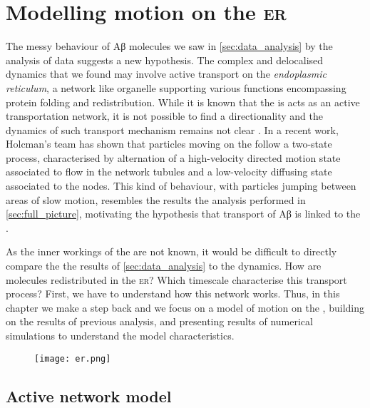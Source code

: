 
\chapter{Modelling motion on the \textsc{er}}\label{sec:modelling}

The messy behaviour of Aβ molecules we saw in \cref{sec:data_analysis} by the analysis of  data suggests a new hypothesis. The complex and delocalised dynamics that we found may involve active transport on the \emph{endoplasmic reticulum}, a network like organelle supporting various functions encompassing protein folding and redistribution. While it is known that the  is acts as an active transportation network, it is not possible to find a directionality and the dynamics of such transport mechanism remains not clear .
In a recent work, Holcman's team has shown that particles moving on the  follow a two-state process, characterised by alternation of a high-velocity directed motion state associated to flow in the network tubules and a low-velocity diffusing state associated to the nodes. This kind of behaviour, with particles jumping between areas of slow motion, resembles the results the analysis performed in \cref{sec:full_picture}, motivating the hypothesis that transport of Aβ is linked to the .

As the inner workings of the  are not known, it would be difficult to directly compare the the results of \cref{sec:data_analysis} to the  dynamics. How are molecules redistributed in the \textsc{er}? Which timescale characterise this transport process? First, we have to understand how this network works. Thus, in this chapter we make a step back and we focus on a model of motion on the , building on the results of previous analysis,  and presenting results of numerical simulations to understand the model characteristics.

\begin{figure}[t!]
  \texttt{[image: er.png]}
\end{figure}

\section{Active network model}

